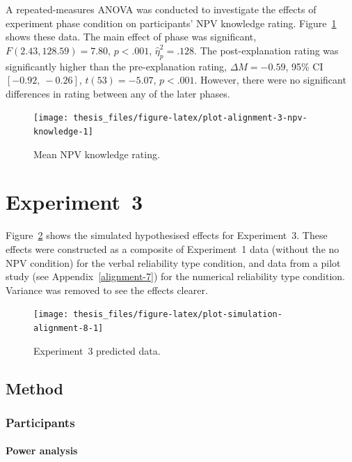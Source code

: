 \documentclass[a4paper, nobind, dvipsnames]{templates/ociamthesis}
\theoremstyle{definition}
\theoremstyle{definition}
\theoremstyle{definition}
\theoremstyle{definition}
\theoremstyle{remark}
\begin{document}
A repeated-measures ANOVA was conducted to investigate the effects of experiment
phase condition on participants' NPV knowledge rating.
Figure~\ref{fig:plot-alignment-3-npv-knowledge} shows these data. The main
effect of phase was significant, \(F(2.43, 128.59) = 7.80\), \(p < .001\), \(\hat{\eta}^2_p = .128\).
The post-explanation rating was significantly higher than the pre-explanation
rating,
\(\Delta M = -0.59\), 95\% CI \([-0.92,~-0.26]\), \(t(53) = -5.07\), \(p < .001\). However, there were no significant
differences in rating between any of the later phases.



\begin{figure}
\texttt{[image: thesis\_files/figure-latex/plot-alignment-3-npv-knowledge-1]} \caption{Mean NPV knowledge rating.}\label{fig:plot-alignment-3-npv-knowledge}
\end{figure}

\hypertarget{alignment-8-appendix}{%
\section{Experiment~3}\label{alignment-8-appendix}}

Figure~\ref{fig:plot-simulation-alignment-8} shows the simulated hypothesised
effects for Experiment~3. These effects were constructed as a composite of
Experiment~1 data (without the no NPV condition) for the verbal reliability type
condition, and data from a pilot study (see Appendix~\ref{alignment-7}) for the
numerical reliability type condition. Variance was removed to see the effects
clearer.



\begin{figure}
\texttt{[image: thesis\_files/figure-latex/plot-simulation-alignment-8-1]} \caption{Experiment~3 predicted data.}\label{fig:plot-simulation-alignment-8}
\end{figure}

\subsection{Method}

\subsubsection{Participants}

\hypertarget{power-analysis-alignment-8}{%
\paragraph{Power analysis}\label{power-analysis-alignment-8}}
\end{document}

